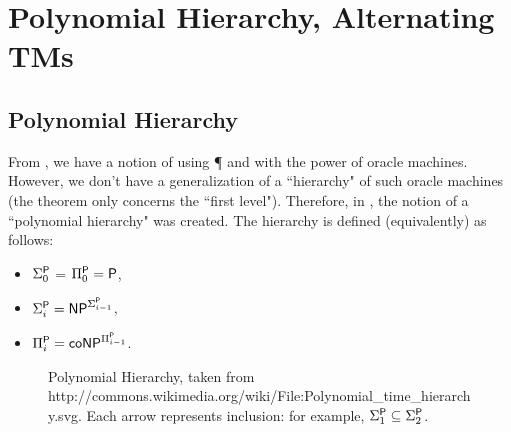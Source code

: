 \section{Polynomial Hierarchy, Alternating TMs}

\subsection{Polynomial Hierarchy}

From , we have a notion of using {\P} and {\NP} with the power of oracle machines. However, we don't have a generalization of a ``hierarchy" of such oracle machines (the theorem only concerns the ``first level"). Therefore, in \cite{originalpolyhierarchypaper}, the notion of a ``polynomial hierarchy" was created. The hierarchy is defined (equivalently) as follows:
\begin{itemize}
\item $\Sigma_0^\P$ = $\Pi_0^\P = \P$,
\item $\Sigma_i^\P = \NP^{\Sigma_{i-1}^\P}$, 
\item $\Pi_i^\P = \coNP^{\Pi_{i-1}^\P}$.
\end{itemize}

\begin{figure}[!htb]
\label{fig:polyhierarchy}
\caption{Polynomial Hierarchy, taken from http://commons.wikimedia.org/wiki/File:Polynomial\_time\_hierarchy.svg. Each arrow represents inclusion: for example, $\Sigma_1^\P \subseteq \Sigma_2^\P$.}
\centering
{}
\end{figure}

